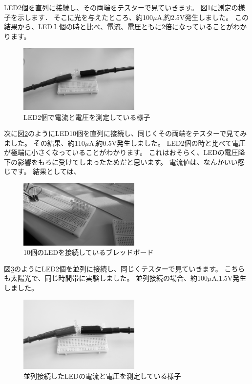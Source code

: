 LED2個を直列に接続し、その両端をテスターで見ていきます。
図\ref{fig:led2}に測定の様子を示します．
そこに光を与えたところ、約100$\mu\si\ampere$,約2.5$\si\volt$発生しました。
この結果から、LED１個の時と比べ、電流、電圧ともに2倍になっていることがわかります。

\begin{figure}[htbp]
    \centering
    \includegraphics[width=60mm]{./assets/mouse/gray/12.JPG}
    \caption{LED2個で電流と電圧を測定している様子}
    \label{fig:led2}
\end{figure}

次に図\ref{fig:led10}のようにLED10個を直列に接続し、同じくその両端をテスターで見てみました。
その結果、約110$\mu\si\ampere$,約0.5$\si\volt$発生しました。
LED2個の時と比べて電圧が極端に小さくなっていることがわかります。
これはおそらく、LEDの電圧降下の影響をもろに受けてしまったためだと思います。
電流値は、なんかいい感じです。
結果としては、{}


\begin{figure}[htbp]
    \centering
    \includegraphics[width=60mm]{./assets/mouse/gray/4.JPG}
    \caption{10個のLEDを接続しているブレッドボード}
    \label{fig:led10}
\end{figure}

図\ref{fig:led_par}のようにLED2個を並列に接続し、同じくテスターで見ていきます。
こちらも太陽光で、同じ時間帯に実験しました。
並列接続の場合、約100$\mu\si\ampere$,1.5$\si\volt$発生しました。


\begin{figure}[htbp]
    \centering
    \includegraphics[width=60mm]{./assets/mouse/gray/13.JPG}
    \caption{並列接続したLEDの電流と電圧を測定している様子}
    \label{fig:led_par}
\end{figure}


